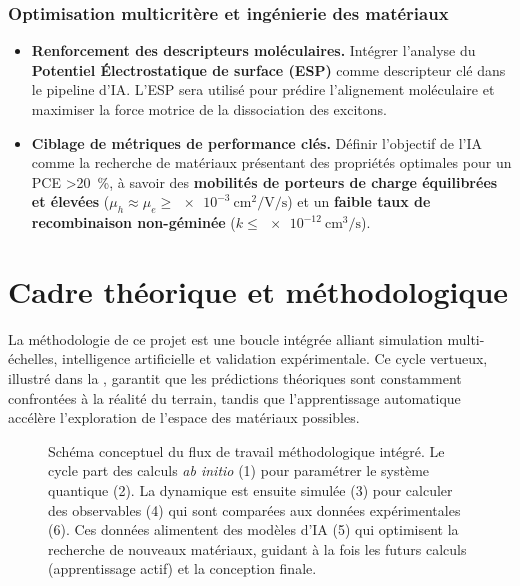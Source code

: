 \documentclass[12pt, a4paper]{article}
\begin{document}
\subsubsection{Optimisation multicritère et ingénierie des matériaux}
\begin{itemize}
    \item \textbf{Renforcement des descripteurs moléculaires.} Intégrer l'analyse du \textbf{Potentiel Électrostatique de surface (ESP)} comme descripteur clé dans le pipeline d'IA. L'ESP sera utilisé pour prédire l'alignement moléculaire et maximiser la force motrice de la dissociation des excitons.

    \item \textbf{Ciblage de métriques de performance clés.} Définir l'objectif de l'IA comme la recherche de matériaux présentant des propriétés optimales pour un PCE \SI{>20}{\percent}, à savoir des \textbf{mobilités de porteurs de charge équilibrées et élevées} ($\mu_h \approx \mu_e \geq \SI{e-3}{\centi\meter\squared\per\volt\per\second}$) et un \textbf{faible taux de recombinaison non-géminée} ($k \leq \SI{e-12}{\centi\meter\cubed\per\second}$).
\end{itemize}

\section{Cadre théorique et méthodologique}

La méthodologie de ce projet est une boucle intégrée alliant simulation multi-échelles, intelligence artificielle et validation expérimentale. Ce cycle vertueux, illustré dans la , garantit que les prédictions théoriques sont constamment confrontées à la réalité du terrain, tandis que l'apprentissage automatique accélère l'exploration de l'espace des matériaux possibles.

\begin{figure}[htb]
\centering
\caption{Schéma conceptuel du flux de travail méthodologique intégré. Le cycle part des calculs \textit{ab initio} (1) pour paramétrer le système quantique (2). La dynamique est ensuite simulée (3) pour calculer des observables (4) qui sont comparées aux données expérimentales (6). Ces données alimentent des modèles d'IA (5) qui optimisent la recherche de nouveaux matériaux, guidant à la fois les futurs calculs (apprentissage actif) et la conception finale.}
\label{fig_workflow_methodo}
\medspace

\end{figure}
\end{document}
